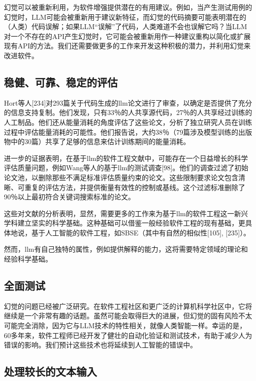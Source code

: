 \begin{translation}
幻觉可以被重新利用，为软件增强提供潜在的有用建议。例如，当产生测试用例的幻觉时，LLM可能会被重新用于建议新特征，而幻觉的代码摘要可能表明潜在的（人类）代码误解；如果LLM“误解”了代码，人类难道不会也误解它吗？当LLM对一个不存在的API产生幻觉时，它可能会被重新用作一种建议重构以简化或扩展现有API的方法。我们还需要做更多的工作来开发这种积极的潜力，并利用幻觉来改进软件。

\subsection{稳健、可靠、稳定的评估}

Hort等人[234]对293篇关于代码生成的llm论文进行了审查，以确定是否提供了充分的信息支持复制。他们发现，只有33％的人共享源代码，27％的人共享经过训练的人工制品。他们还从能量消耗的角度评估了这些论文，分析了独立研究人员在训练过程中评估能量消耗的可能性。他们报告说，大约38％（79篇涉及模型训练的出版物中的30篇）共享了足够的信息来估计训练期间的能量消耗。

进一步的证据表明，在基于llm的软件工程文献中，可能存在一个日益增长的科学评估质量问题，例如Wang等人的基于llm的测试调查[98]。他们的调查过滤了初始论文池，以删除那些不满足标准评估质量约束的论文。这些限制要求论文包含清晰、可重复的评估方法，并提供衡量有效性的控制或基线。这个过滤标准删除了90％以上最初符合关键词搜索标准的论文。

这些对文献的分析表明，显然，需要更多的工作来为基于llm的软件工程这一新兴学科建立坚实的科学基础。这种基础可以借鉴一般经验软件工程的现有基础，更具体地说，基于人工智能的软件工程，如SBSE（其中有自然的相似性[105], [235]）。

然而，llm有自己独特的属性，例如提供解释的能力，这将需要特定领域的理论和经验科学基础。

\subsection{全面测试}

幻觉的问题已经被广泛研究。在软件工程社区和更广泛的计算机科学社区中，它将继续是一个非常有趣的话题。虽然可能会取得巨大的进展，但幻觉的固有风险不太可能完全消除，因为它与LLM技术的特性相关，就像人类智能一样。幸运的是，60多年来，软件工程师已经开发了健壮的自动化验证和测试技术，有助于减少人为错误的影响。我们预计这些技术也将延续到人工智能的错误中。

\subsection{处理较长的文本输入}


\end{translation}
